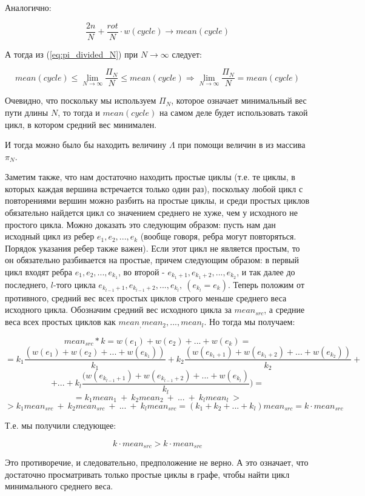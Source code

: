 \documentclass[a4paper,12pt]{extarticle}
\theoremstyle{plain} %
\begin{document}
\begin{large}
Аналогично:

$$\frac{2n}{N} + \frac{rot}{N} \cdot w(cycle) \rightarrow mean(cycle)$$

А тогда из (\ref{eq:pi_divided_N}) при $N \rightarrow \infty$ следует:

$$mean(cycle) \le \lim_{N \rightarrow \infty} \frac{\Pi_N}{N} \le mean(cycle) \Rightarrow \lim_{N \rightarrow \infty}\frac{\Pi_N}{N} = mean(cycle)$$

Очевидно, что поскольку мы используем $\Pi_N$, которое означает минимальный вес пути длины $N$, то тогда и $mean(cycle)$ на самом деле будет использовать такой цикл, в котором средний вес минимален.

И тогда можно было бы находить величину $\Lambda$ при помощи величин в из массива $\pi_N$.

Заметим также, что нам достаточно находить простые циклы (т.е. те циклы, в которых каждая вершина встречается только один раз), поскольку любой цикл с повторениями вершин можно разбить на простые циклы, и среди простых циклов обязательно найдется цикл со значением среднего не хуже, чем у исходного не простого цикла. Можно доказать это следующим образом: пусть нам дан исходный цикл из ребер $e_1, e_2, ..., e_k$ (вообще говоря, ребра могут повторяться. Порядок указания ребер также важен). Если этот цикл не является простым, то он обязательно разбивается на простые, причем следующим образом: в первый цикл входят ребра $e_1, e_2, ..., e_{k_1}$, во второй - $e_{k_1+1}, e_{k_1+2}, ..., e_{k_2}$, и так далее до последнего, $l$-того цикла $e_{k_{l-1}+1}, e_{k_{l-1}+2}, ..., e_{k_l},~ (e_{k_l} = e_k)$.  Теперь положим от противного, средний вес всех простых циклов строго меньше среднего веса исходного цикла. Обозначим средний вес исходного цикла за $mean_{src}$, а средние веса всех простых циклов как $mean_, mean_2, ..., mean_l$. Но тогда мы получаем:

$$mean_{src} * k = w(e_1) + w(e_2) + ... + w(e_k) =$$
$$= k_1\frac{(w(e_1) +  w(e_2) +  ... + w(e_{k_1}))}{k_1} + k_2\frac{(w(e_{k_1+1}) + w(e_{k_1+2}) + ... + w(e_{k_2}))}{k_2} +$$
$$+ ... + k_l\frac{(w(e_{k_{l-1}+1}) + w(e_{k_{l-1}+2}) + ... + w(e_{k_l})}{k_l}) = $$
$$=k_1mean_1 ~+ ~k_2mean_2 ~+ ~... ~+ ~k_lmean_l~ >$$
$$> k_1mean_{src}~ +~ k_2mean_{src}~ +~ ...~ +~ k_lmean_{src} = (k_1 + k_2 + ... + k_l)mean_{src} = k \cdot mean_{src}$$

Т.е. мы получили следующее:

$$k \cdot mean_{src} > k \cdot mean_{src}$$

Это противоречие, и следовательно, предположение не верно. А это означает, что достаточно просматривать только простые циклы в графе, чтобы найти цикл минимального среднего веса.


\end{large}
\end{document}
